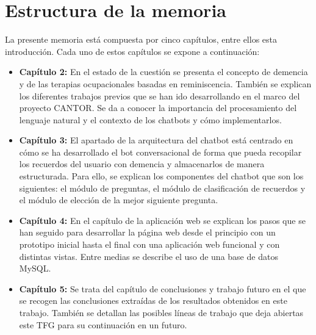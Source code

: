 \section{Estructura de la memoria}

La presente memoria está compuesta por cinco capítulos, entre ellos esta introducción. Cada uno de estos capítulos se expone a continuación: 

\begin{itemize}
	\item \textbf{Capítulo 2:} En el estado de la cuestión se presenta el concepto de demencia y de las terapias ocupacionales basadas en reminiscencia. También se explican los diferentes trabajos previos que se han ido desarrollando en el marco del proyecto CANTOR. Se da a conocer la importancia del procesamiento del lenguaje natural y el contexto de los chatbots y cómo implementarlos.
	\item \textbf{Capítulo 3:} El apartado de la arquitectura del chatbot está centrado en cómo se ha desarrollado el bot conversacional de forma que pueda recopilar los recuerdos del usuario con demencia y almacenarlos de manera estructurada. Para ello, se explican los componentes del chatbot que son los siguientes: el módulo de preguntas, el módulo de clasificación de recuerdos y el módulo de elección de la mejor siguiente pregunta. 
	\item \textbf{Capítulo 4:} En el capítulo de la aplicación web se explican los pasos que se han seguido para desarrollar la página web desde el principio con un prototipo inicial hasta el final con una aplicación web funcional y con distintas vistas. Entre medias se describe el uso de una base de datos MySQL.
	\item \textbf{Capítulo 5:} Se trata del capítulo de conclusiones y trabajo futuro en el que se recogen las conclusiones extraídas de los resultados obtenidos en este trabajo. También se detallan las posibles líneas de trabajo que deja abiertas este TFG para su continuación en un futuro.
\end{itemize}


